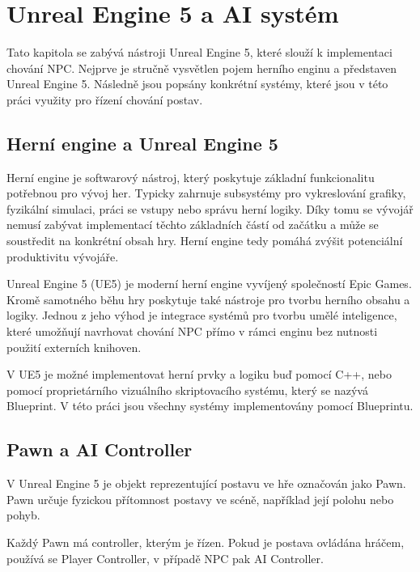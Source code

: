 \chapter{Unreal Engine 5 a AI systém}

Tato kapitola se zabývá nástroji Unreal Engine 5, které slouží k implementaci chování NPC. 
Nejprve je stručně vysvětlen pojem herního enginu a představen Unreal Engine 5. 
Následně jsou popsány konkrétní systémy, které jsou v této práci využity pro řízení chování postav.

\section{Herní engine a Unreal Engine 5}

Herní engine je softwarový nástroj, který poskytuje základní funkcionalitu potřebnou pro vývoj her. 
Typicky zahrnuje subsystémy pro vykreslování grafiky, fyzikální simulaci, práci se vstupy nebo správu herní logiky. 
Díky tomu se vývojář nemusí zabývat implementací těchto základních částí od začátku a může se soustředit na konkrétní obsah hry.\cite[s.~11--13]{gregory2018} 
Herní engine tedy pomáhá zvýšit potenciální produktivitu vývojáře.

Unreal Engine 5 (UE5) je moderní herní engine vyvíjený společností Epic Games. 
Kromě samotného běhu hry poskytuje také nástroje pro tvorbu herního obsahu a logiky. 
Jednou z jeho výhod je integrace systémů pro tvorbu umělé inteligence, které umožňují navrhovat chování NPC přímo 
v rámci enginu bez nutnosti použití externích knihoven.\cite{epic_gameplay_systems}

V UE5 je možné implementovat herní prvky a logiku buď pomocí C++, nebo pomocí proprietárního vizuálního skriptovacího systému, který se nazývá Blueprint.
V této práci jsou všechny systémy implementovány pomocí Blueprintu.


\section{Pawn a AI Controller}

V Unreal Engine 5 je objekt reprezentující postavu ve hře označován jako Pawn. 
Pawn určuje fyzickou přítomnost postavy ve scéně, například její polohu nebo pohyb.\cite{epic_pawn} 

Každý Pawn má controller, kterým je řízen. 
Pokud je postava ovládána hráčem, používá se Player Controller, v případě NPC pak AI Controller.\cite{epic_controller}

